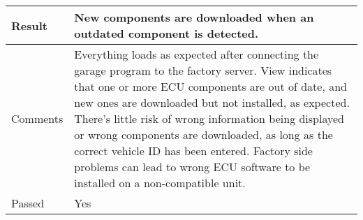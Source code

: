 \begin{table}[H]
\begin{tabularx}{1.0\textwidth}{
    |p{}     %
    |p{}|    %
}
Result
& New components are downloaded when an outdated component is detected.
\\
\hline

Comments
& Everything loads as expected after connecting the garage program to the factory server. View indicates that one or more ECU components are out of date, and new ones are downloaded but not installed, as expected. There's little risk of wrong information being displayed or wrong components are downloaded, as long as the correct vehicle ID has been entered. Factory side problems can lead to wrong ECU software to be installed on a non-compatible unit.
\\
\hline

Passed
& Yes
\\
\hline

\end{tabularx}
\end{table}


